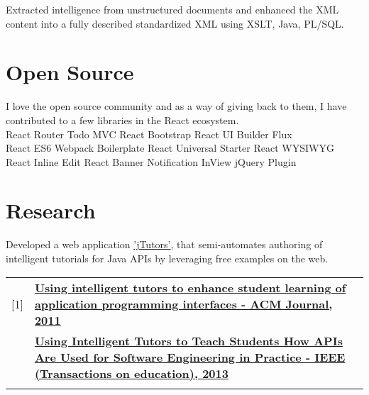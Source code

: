 \documentclass[]{my-resume-openfont}
\begin{document}
\begin{minipage}[t]{0.66\textwidth}
\begin{tightemize}
\item Extracted intelligence from unstructured documents and enhanced the XML content into a fully described standardized XML using XSLT, Java, PL/SQL.
\end{tightemize}


\section{Open Source}
I love the open source community and as a way of giving back to them, I have contributed to a few libraries in the React ecosystem. \\
\sectionsep
{}
React Router \textbullet{} Todo MVC \textbullet{} React Bootstrap \textbullet{} React UI Builder \textbullet{} Flux \\
React ES6 Webpack Boilerplate \textbullet{} React Universal Starter \textbullet{} React WYSIWYG \\ 
React Inline Edit \textbullet{} React Banner Notification \textbullet{} InView jQuery Plugin
\sectionsep


\section{Research}
Developed a web application \href{http://ir.library.oregonstate.edu/xmlui/handle/1957/30097}{'jTutors'}, that semi-automates authoring of intelligent tutorials for Java APIs by leveraging free examples on the web.
\sectionsep

\sectionsep
\begin{tabular}{p{0.3cm}p{11.6cm}}
[1]   & \textbf{\href{http://dl.acm.org/citation.cfm?id=2037190}{Using intelligent tutors to enhance student learning of application programming interfaces - ACM Journal, 2011}}\\ \relax
[2]   & \textbf{\href{http://ieeexplore.ieee.org/xpl/articleDetails.jsp?reload=true\&arnumber=6422340}{Using Intelligent Tutors to Teach Students How APIs Are Used for Software Engineering in Practice - IEEE (Transactions on education), 2013}}\\ \relax
\end{tabular}
\sectionsep

\end{minipage} 
\end{document}
